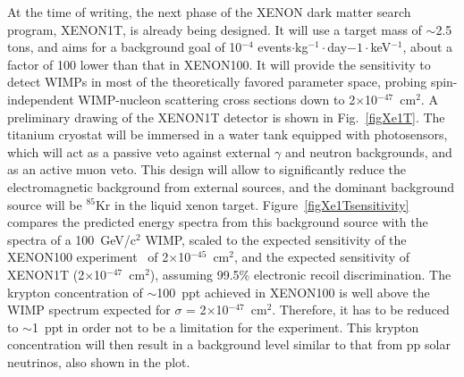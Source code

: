 At the time of writing, the next phase of the XENON dark matter search program, XENON1T, is already being designed. It will use a target mass of $\sim$2.5 tons, and aims for a background goal of 10$^{-4}$ events$\cdot$kg$^{-1}\cdot$day${-1}\cdot$keV$^{-1}$, about a factor of 100 lower than that in XENON100. It will  provide the sensitivity to detect WIMPs in most of the theoretically favored parameter space, probing spin-independent WIMP-nucleon scattering cross sections down to 2$\times$10$^{-47}$~cm$^{2}$. A preliminary drawing of the XENON1T detector is shown in Fig.~\ref{figXe1T}. The titanium cryostat will be immersed in a water tank equipped with photosensors, which will act as a passive veto against external $\gamma$ and neutron backgrounds, and as an active muon veto. This design will allow to significantly reduce the electromagnetic background from external sources, and the dominant background source will be $^{85}$Kr in the liquid xenon target. Figure~\ref{figXe1Tsensitivity} compares the predicted energy spectra from this background source with the spectra of a 100~GeV/c$^{2}$ WIMP, scaled to the expected sensitivity of the XENON100 experiment~\cite{xe100-projection} of 2$\times$10$^{-45}$~cm$^{2}$, and the expected sensitivity of XENON1T (2$\times$10$^{-47}$~cm$^{2}$), assuming 99.5\% electronic recoil discrimination. The krypton concentration of $\sim$100~ppt achieved in XENON100 is well above the WIMP spectrum expected for $\sigma$ = 2$\times$10$^{-47}$~cm$^{2}$. Therefore, it has to be reduced to $\sim$1~ppt in order not to be a limitation for the experiment. This krypton concentration will then result in a background level similar to that from pp solar neutrinos, also shown in the plot.

